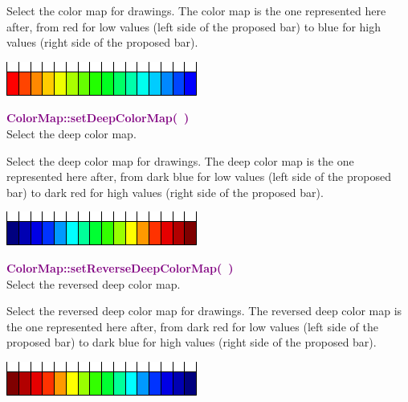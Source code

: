 Select the color map for drawings.
The color map is the one represented here after, from red for low values (left side of the proposed bar) to blue for high values (right side of the proposed bar).
\begin{center}
\includegraphics{Figures/ProgrammingLanguage/ReverseColorMap}
\end{center}

\textcolor{purple}{\textbf{ColorMap::setDeepColorMap(~)}}\label{ColorMap::setDeepColorMap()}\\
Select the deep color map.

Select the deep color map for drawings.
The deep color map is the one represented here after, from dark blue for low values (left side of the proposed bar) to dark red for high values (right side of the proposed bar).
\begin{center}
\includegraphics{Figures/ProgrammingLanguage/DeepColorMap}
\end{center}

\textcolor{purple}{\textbf{ColorMap::setReverseDeepColorMap(~)}}\label{ColorMap::setReverseDeepColorMap()}\\
Select the reversed deep color map.

Select the reversed deep color map for drawings.
The reversed deep color map is the one represented here after, from dark red for low values (left side of the proposed bar) to dark blue for high values (right side of the proposed bar).
\begin{center}
\includegraphics{Figures/ProgrammingLanguage/ReverseDeepColorMap}
\end{center}

